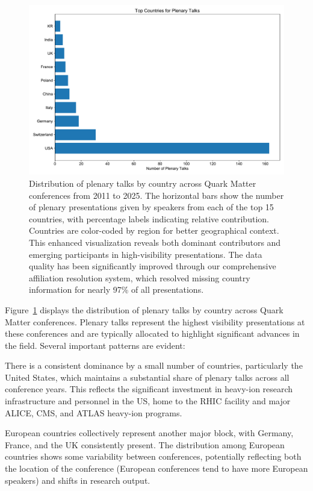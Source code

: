 \documentclass[a4paper,11pt]{article}
\begin{document}
\begin{figure}[H]
\centering
\includegraphics[width=\textwidth]{figures/plenary_talks_by_country.pdf}
\caption{Distribution of plenary talks by country across Quark Matter conferences from 2011 to 2025. The horizontal bars show the number of plenary presentations given by speakers from each of the top 15 countries, with percentage labels indicating relative contribution. Countries are color-coded by region for better geographical context. This enhanced visualization reveals both dominant contributors and emerging participants in high-visibility presentations. The data quality has been significantly improved through our comprehensive affiliation resolution system, which resolved missing country information for nearly 97\% of all presentations.}
\label{fig:country_plenary}
\end{figure}

Figure~\ref{fig:country_plenary} displays the distribution of plenary talks by country across Quark Matter conferences. Plenary talks represent the highest visibility presentations at these conferences and are typically allocated to highlight significant advances in the field. Several important patterns are evident:

There is a consistent dominance by a small number of countries, particularly the United States, which maintains a substantial share of plenary talks across all conference years. This reflects the significant investment in heavy-ion research infrastructure and personnel in the US, home to the RHIC facility and major ALICE, CMS, and ATLAS heavy-ion programs.

European countries collectively represent another major block, with Germany, France, and the UK consistently present. The distribution among European countries shows some variability between conferences, potentially reflecting both the location of the conference (European conferences tend to have more European speakers) and shifts in research output.
\end{document}
